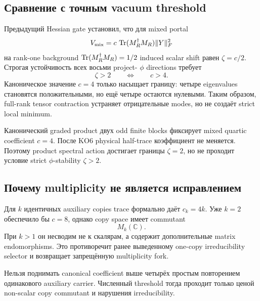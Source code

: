 \subsection{Сравнение с точным vacuum threshold}

Предыдущий Hessian gate установил, что для mixed portal
\begin{equation}
 V_{\rm mix}=c\,\operatorname{Tr}(M_R^\dagger M_R)\|Y\|_F^2
\end{equation}
на rank-one background
\(\operatorname{Tr}(M_R^\dagger M_R)=1/2\) induced scalar shift равен
\(\zeta=c/2\). Строгая устойчивость всех восьми project-
\(\phi\) directions требует
\begin{equation}
 \zeta>2
 \qquad\Longleftrightarrow\qquad
 c>4.
\end{equation}
Каноническое значение \(c=4\) только насыщает границу: четыре eigenvalues
становятся положительными, но ещё четыре остаются нулевыми. Таким образом,
full-rank tensor contraction устраняет отрицательные modes, но не создаёт
strict local minimum.

\begin{theorem}
Канонический graded product двух odd finite blocks фиксирует mixed quartic
coefficient \(c=4\). После KO6 physical half-trace коэффициент не меняется.
Поэтому product spectral action достигает границы \(\zeta=2\), но не проходит
условие strict \(\phi\)-stability \(\zeta>2\).
\end{theorem}

\subsection{Почему multiplicity не является исправлением}

Для \(k\) идентичных auxiliary copies trace формально даёт
\(c_k=4k\). Уже \(k=2\) обеспечило бы \(c=8\), однако copy space имеет
commutant
\begin{equation}
 M_k(\mathbb C).
\end{equation}
При \(k>1\) он несводим не к скалярам, а содержит дополнительные matrix
endomorphisms. Это противоречит ранее выведенному one-copy irreducibility
selector и возвращает запрещённую multiplicity fork.

\begin{nogocriterion}
Нельзя поднимать canonical coefficient выше четырёх простым повторением
одинакового auxiliary carrier. Численный threshold тогда проходит только
ценой non-scalar copy commutant и нарушения irreducibility.
\end{nogocriterion}


